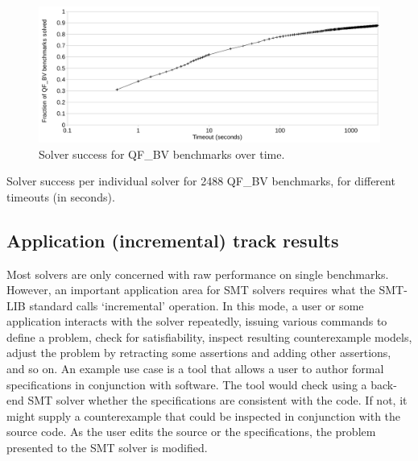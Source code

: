 \documentclass[twoside,11pt]{article}
\begin{document}
\begin{figure}
\begin{center}
\includegraphics[width=.95\textwidth]{QF_BV-timeout-logscale.pdf}
\end{center}
\caption{Solver success for QF\_BV benchmarks over time.}
\label{Fig:timeouts}
\end{figure}

\begin{table}
\caption{Solver success per individual solver for 2488 QF\_BV benchmarks, for different timeouts (in seconds).}
\label{Fig:winners}
\centering

\end{table}

\subsection{Application (incremental) track results}
\label{sec:application-results}

Most solvers are only concerned with raw performance on single benchmarks. However, an important application area for SMT solvers requires what the SMT-LIB standard calls `incremental' operation.
In this mode, a user or some application interacts with the solver repeatedly, issuing various commands to define a problem, check for satisfiability, inspect resulting counterexample models, adjust the problem by retracting some assertions and adding other assertions, and so on. An example use case is a tool that allows a user to author formal specifications in conjunction with software. The tool would
check using a back-end SMT solver whether the specifications are consistent with the code. If not, it might
supply a counterexample that could be inspected in conjunction with the source code. As the user edits the source or the specifications, the problem presented to the SMT solver is modified.
\end{document}
